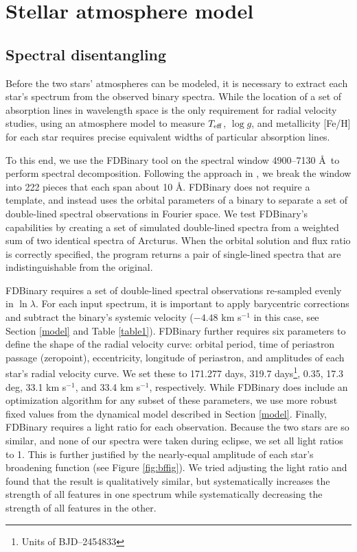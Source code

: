 \section{Stellar atmosphere model}\label{atm}

\subsection{Spectral disentangling}\label{disentangle}
Before the two stars' atmospheres can be modeled, it is necessary to extract each star's spectrum from the observed binary spectra. While the location of a set of absorption lines in wavelength space is the only requirement for radial velocity studies, using an atmosphere model to measure $T_{\rm{eff}}$, $\log g$, and metallicity [Fe/H] for each star requires precise equivalent widths of particular absorption lines.

To this end, we use the FDBinary tool \citep{ili04} on the spectral window 4900--7130 \AA \ to perform spectral decomposition. Following the approach in \citet{bec14a}, we break the window into 222 pieces that each span about 10 \AA. FDBinary does not require a template, and instead uses the orbital parameters of a binary to separate a set of double-lined spectral observations in Fourier space. We test FDBinary's capabilities by creating a set of simulated double-lined spectra from a weighted sum of two identical spectra of Arcturus. When the orbital solution and flux ratio is correctly specified, the program returns a pair of single-lined spectra that are indistinguishable from the original.

FDBinary requires a set of double-lined spectral observations re-sampled evenly in $\ln \lambda$. For each input spectrum, it is important to apply barycentric corrections and subtract the binary's systemic velocity ($-4.48$ km s$^{-1}$ in this case, see Section \ref{model} and Table \ref{table1}). FDBinary further requires six parameters to define the shape of the radial velocity curve: orbital period, time of periastron passage (zeropoint), eccentricity, longitude of periastron, and amplitudes of each star's radial velocity curve. We set these to 171.277 days, 319.7 days\footnote{Units of BJD--2454833}, 0.35, 17.3 deg, 33.1 km s$^{-1}$, and 33.4 km s$^{-1}$, respectively. While FDBinary does include an optimization algorithm for any subset of these parameters, we use more robust fixed values from the dynamical model described in Section \ref{model}. Finally, FDBinary requires a light ratio for each observation. Because the two stars are so similar, and none of our spectra were taken during eclipse, we set all light ratios to 1. This is further justified by the nearly-equal amplitude of each star's broadening function (see Figure \ref{fig:bffig}). We tried adjusting the light ratio and found that the result is qualitatively similar, but systematically increases the strength of all features in one spectrum while systematically decreasing the strength of all features in the other.

